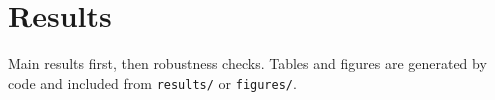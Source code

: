 \chapter{Results}

Main results first, then robustness checks. Tables and figures are generated by code and included
from \texttt{results/} or \texttt{figures/}.
